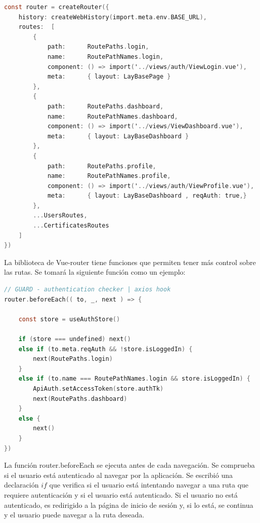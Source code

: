 \begin{lstlisting}[language=C,caption={Configuración de las rutas}, label={lst:router}]
const router = createRouter({
    history: createWebHistory(import.meta.env.BASE_URL),
    routes:  [
        {
            path:      RoutePaths.login,
            name:      RoutePathNames.login,
            component: () => import('../views/auth/ViewLogin.vue'),
            meta:      { layout: LayBasePage }
        },
        {
            path:      RoutePaths.dashboard,
            name:      RoutePathNames.dashboard,
            component: () => import('../views/ViewDashboard.vue'),
            meta:      { layout: LayBaseDashboard }
        },
        {
            path:      RoutePaths.profile,
            name:      RoutePathNames.profile,
            component: () => import('../views/auth/ViewProfile.vue'),
            meta:      { layout: LayBaseDashboard , reqAuth: true,}
        },
        ...UsersRoutes,
        ...CertificatesRoutes
    ]
})
\end{lstlisting}

La biblioteca de Vue-router tiene funciones que permiten tener más control sobre las rutas. Se tomará la siguiente función como un ejemplo:

\begin{lstlisting}[language=C,caption={Función para controlar el acceso a rutas}, label={lst:routerAccess}]
// GUARD - authentication checker | axios hook
router.beforeEach(( to, _, next ) => {

    const store = useAuthStore() 

    if (store === undefined) next()
    else if (to.meta.reqAuth && !store.isLoggedIn) {
        next(RoutePaths.login)
    }
    else if (to.name === RoutePathNames.login && store.isLoggedIn) {            
        ApiAuth.setAccessToken(store.authTk)                                    
        next(RoutePaths.dashboard)
    }
    else {
        next()                                                                  
    }
})
\end{lstlisting}

La función router.beforeEach se ejecuta antes de cada navegación. Se comprueba si el usuario está autenticado al navegar por la aplicación.
Se escribió una declaración $if$ que verifica si el usuario está intentando navegar a una ruta que requiere autenticación y si el usuario está autenticado. Si el usuario no está autenticado, es redirigido a la página de inicio de sesión y, si lo está, se continua y el usuario puede navegar a la ruta deseada.

